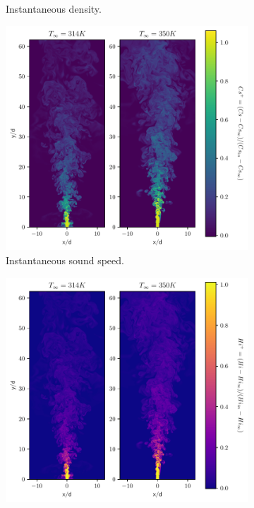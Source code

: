 \begin{figure}[H]
\begin{subfigure}{0.5\textwidth}
	\caption{Instantaneous density.} \label{noniso_rho_1}
\end{subfigure}
\hfill
\begin{subfigure}{0.5\textwidth}
	\centering
	\includegraphics[scale=.45]{figures/Plots/vertical/Cs_scaled_vert_noniso.pdf}
	\caption{Instantaneous sound speed.} \label{noniso_Cs_1}
\end{subfigure}
\vfill
\begin{subfigure}{0.5\textwidth}
	\centering
	\includegraphics[scale=.45]{figures/Plots/vertical/Hi_scaled_vert_noniso.pdf}

\end{subfigure}
\end{figure}
